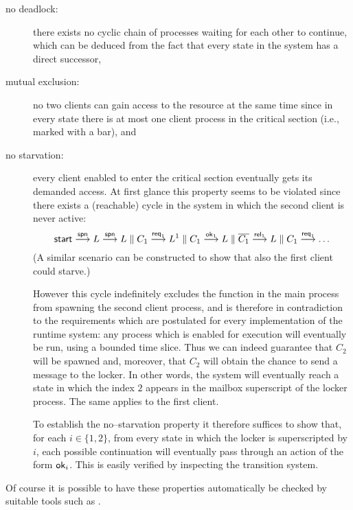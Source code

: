 \documentclass{entcs}
\begin{document}
\begin{description} 
  \item[no deadlock:] there exists no cyclic chain of processes waiting for
    each other to continue, which can be deduced from the fact that every
    state in the system has a direct successor,
  \item[mutual exclusion:] no two clients can gain access to the resource at
    the same time since in every state there is at most one client process in
    the critical section (i.e., marked with a bar), and 
  \item[no starvation:] every client enabled to enter the critical section
    eventually gets its demanded access. At first glance this property seems 
    to be violated since there exists a (reachable) cycle in the system in
    which the second client is never active: 
    \[\key{start} 
      \trans{\key{spn}} L
      \trans{\key{spn}} L \parallel C_1 
      \trans{\key{req}_1} L^1 \parallel C_1
      \trans{\key{ok}_1} L \parallel \compl{C_1} 
      \trans{\key{rel}_1} L \parallel C_1 
      \trans{\key{req}_1} \ldots 
    \] 
    (A similar scenario can be constructed to show that also the first client
    could starve.) 

    However this cycle indefinitely excludes the  function in the
    main process from spawning the second client process, and is therefore in
    contradiction to the requirements which are postulated for every
    implementation of the \Erlang runtime system: any process which is enabled
    for execution will eventually be run, using a bounded time slice. Thus we
    can indeed guarantee that $C_2$ will be spawned and, moreover, that
    $C_2$ will obtain the chance to send a  message to the
    locker. In other words, the system will eventually reach a state in
    which the index $2$ appears in the mailbox superscript of the locker
    process. The same applies to the first client.

    To establish the no--starvation property it therefore suffices to show
    that, for each $i \in \{1, 2\}$, from every state in which the locker
    is superscripted by $i$, each possible continuation will
    eventually pass through an action of the form $\key{ok}_i$. This is easily
    verified by inspecting the transition system.
\end{description}

Of course it is possible to have these properties automatically be checked by
suitable tools such as \Truth.
\end{document}
